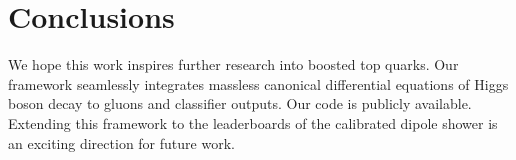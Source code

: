 \section{Conclusions}\label{sec:conclusions}

We hope this work inspires further research into boosted top quarks. Our
framework seamlessly integrates massless canonical differential
equations of Higgs boson decay to gluons and classifier outputs. Our
code is publicly available. Extending this framework to the leaderboards
of the calibrated dipole shower is an exciting direction for future
work.

